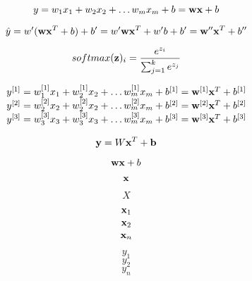 \documentclass[11pt]{article}
\begin{document}
\[
y = w_1 x_1 + w_2 x_2 + \ldots w_m x_m + b = {\bf w}  {\bf x} + b\\
\]

\[
\hat{y} = w'  ({\bf w}  {\bf x}^T + b) + b' = w'  {\bf w}  {\bf x}^T + w'b + b' = {\bf w}'' {\bf x}^T + b''
\]

\[
softmax({\bf z})_i = \frac{e^{z_i}}{\sum_{j=1}^k e^{z_j}}
\]

\[
\begin{array}{l}
y^{[1]} = w_1^{[1]} x_1 + w_2^{[1]} x_2 + \ldots w_m^{[1]} x_m + b^{[1]} = {\bf w}^{[1]} {\bf x}^T + b^{[1]}\\
y^{[2]} = w_2^{[2]} x_2 + w_2^{[2]} x_2 + \ldots w_m^{[2]} x_m + b^{[2]} = {\bf w}^{[2]} {\bf x}^T + b^{[2]}\\
y^{[3]} = w_3^{[3]} x_3 + w_3^{[3]} x_3 + \ldots w_m^{[3]} x_m + b^{[3]} = {\bf w}^{[3]} {\bf x}^T + b^{[3]}\\
\end{array}
\]

\[
{\bf y} = W {\bf x}^T + {\bf b}
\]

\[
{\bf w} {\bf x} + b
\]

\[
{\bf x}
\]

\[
X
\]

\[
{\bf x}_1
\]
\[
{\bf x}_2
\]
\[
{\bf x}_n
\]

\[
y_1
\]
\[
y_2
\]
\[
y_n
\]


 
\end{document}

